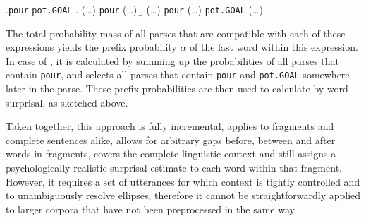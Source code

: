 \ex.\texttt{pour} \texttt{pot.GOAL}
\a. (\dots) \texttt{pour} (\dots)
\b. (\dots) \texttt{pour} (\dots) \texttt{pot.GOAL} (\dots)

The total probability mass of all parses that are compatible with each of these expressions yields the prefix probability $\alpha$ of the last word within this expression. In case of \Last[a], it is calculated by summing up the probabilities of all parses that contain \texttt{pour}, and \Last[b] selects all parses that contain \texttt{pour} and \texttt{pot.GOAL} somewhere later in the parse. These prefix probabilities are then used to calculate by-word surprisal, as sketched above.

Taken together, this approach is fully incremental, applies to fragments and complete sentences alike, allows for arbitrary gaps before, between and after words in fragments, covers the complete linguistic context and still assigns a psychologically realistic surprisal estimate to each word within that fragment. However, it requires a set of utterances for which context is tightly controlled and to unambiguously resolve ellipses, therefore it cannot be straightforwardly applied to larger corpora that have not been preprocessed in the same way.

